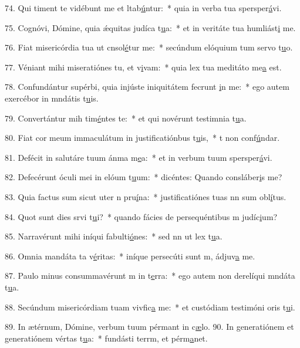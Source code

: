 74. Qui timent te vidébunt me et ltab\uline{ú}ntur:~* quia in verba tua spersper\uline{á}vi.\par 
75. Cognóvi, Dómine, quia ǽquitas judíca t\uline{u}a:~* et in veritáte tua humliást\uline{i} me.\par 
76. Fiat misericórdia tua ut cnsol\uline{é}tur me:~* secúndum elóquium tum servo t\uline{u}o.\par 
77. Véniant mihi miseratiónes tu, et v\uline{i}vam:~* quia lex tua meditáto me\uline{a} est.\par 
78. Confundántur supérbi, quia injúste iniquitátem fecrunt \uline{i}n me:~* ego autem exercébor in mndátis t\uline{u}is.\par 
79. Convertántur mih tim\uline{é}ntes te:~* et qui novérunt testimnia t\uline{u}a.\par 
80. Fiat cor meum immaculátum in justificatiónbus t\uline{u}is,~* t non conf\uline{ú}ndar.\par 
81. Defécit in salutáre tuum ánma m\uline{e}a:~* et in verbum tuum spersper\uline{á}vi.\par 
82. Defecérunt óculi mei in elóum t\uline{u}um:~* dicéntes: Quando consláber\uline{i}s me?\par 
83. Quia factus sum sicut uter n pru\uline{í}na:~* justificatiónes tuas nn sum obl\uline{í}tus.\par 
84. Quot sunt dies srvi t\uline{u}i?~* quando fácies de persequéntibus m judíc\uline{i}um?\par 
85. Narravérunt mihi iníqui fabulti\uline{ó}nes:~* sed nn ut lex t\uline{u}a.\par 
86. Omnia mandáta ta v\uline{é}ritas:~* iníque persecúti sunt m, ádjuv\uline{a} me.\par 
87. Paulo minus consummavérunt m in t\uline{e}rra:~* ego autem non derelíqui mndáta t\uline{u}a.\par 
88. Secúndum misericórdiam tuam vivfic\uline{a} me:~* et custódiam testimóni oris t\uline{u}i.\par 
89. In ætérnum, Dómine, verbum tuum pérmant in c\uline{æ}lo.
90. In generatiónem et generatiónem vértas t\uline{u}a:~* fundásti terrm, et pérm\uline{a}net.\par 
